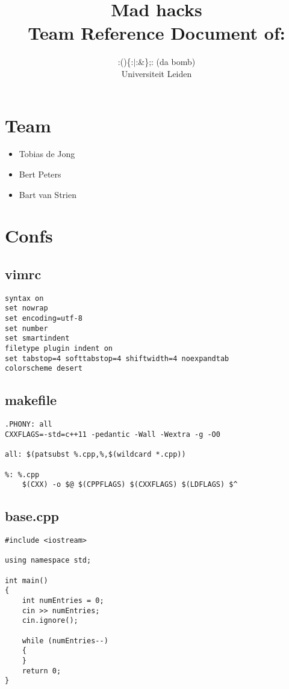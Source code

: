 \documentclass[10pt]{article}
\title{Mad hacks\\[1cm]
\small{Team Reference Document of:}}
\author{:()\{:$\vert$:\&\};: (da bomb)\\[1cm]
	\small{Universiteit Leiden}}
\begin{document}
\fontsize{10}{12}


\maketitle
\newpage
\section{Team}
\begin{itemize}
\item Tobias de Jong
\item Bert Peters
\item Bart van Strien
\end{itemize}

\section{Confs}
\subsection{vimrc}
\begin{lstlisting}
syntax on
set nowrap
set encoding=utf-8
set number
set smartindent
filetype plugin indent on
set tabstop=4 softtabstop=4 shiftwidth=4 noexpandtab
colorscheme desert
\end{lstlisting}

\subsection{makefile}
\begin{lstlisting}
.PHONY: all
CXXFLAGS=-std=c++11 -pedantic -Wall -Wextra -g -O0

all: $(patsubst %.cpp,%,$(wildcard *.cpp))

%: %.cpp
	$(CXX) -o $@ $(CPPFLAGS) $(CXXFLAGS) $(LDFLAGS) $^
\end{lstlisting}

\lstset{language=c++}

\subsection{base.cpp}
\begin{lstlisting}
#include <iostream>

using namespace std;

int main()
{
	int numEntries = 0;
	cin >> numEntries;
	cin.ignore();
	
	while (numEntries--)
	{
	}
	return 0;
}
\end{lstlisting}
\end{document}

